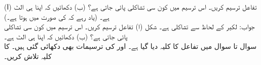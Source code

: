 (ا) تفاعل  ترسیم کریں۔ اس ترسیم میں کون سی تشاکلی پائی جاتی ہے؟ (ب) دکھائیں کہ  اپنا ہی الٹ ہے۔ (یاد رہے کہ  کی صورت میں  ہوتا ہے۔)\\
جواب:\quad
لکیر  کے لحاظ سے تشاکلی ہے۔ شکل 
(ا) تفاعل  ترسیم کریں۔ اس ترسیم میں کون سی تشاکلی پائی جاتی ہے؟ (ب) دکھائیں کہ  اپنا ہی الٹ ہے۔
\\
سوال  تا سوال  میں تفاعل  کا کلیہ دیا گیا ہے۔  اور  کی ترسیمات بھی دکھائی گئی ہیں۔  کا کلیہ تلاش کریں۔

